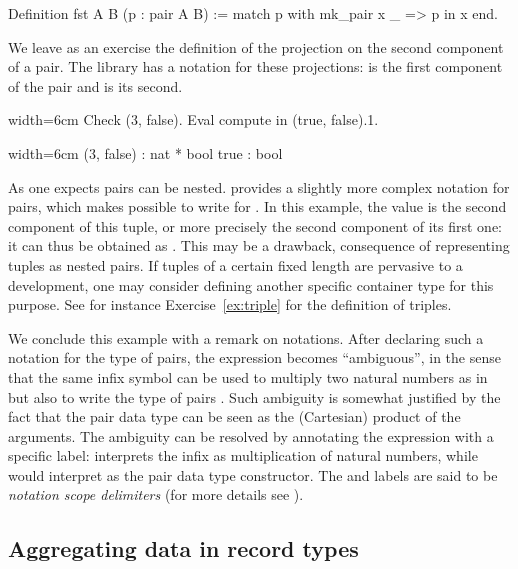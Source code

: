 \begin{coq}{}{}
Definition fst A B (p : pair A B) :=
  match p with mk_pair x _ => p in x end.
\end{coq}

We leave as an exercise the definition of the projection on the second
component of a pair. The \mcbMC{} library has a notation for these
projections:  is the first component of the pair 
and  is its second.

\begin{coq}{}{width=6cm}
Check (3, false).
Eval compute in (true, false).1.
\end{coq}
\begin{coqout}{}{width=6cm}
(3, false) : nat * bool
true : bool
\end{coqout}
As one expects pairs can be nested. \Coq{} provides a slightly more complex
notation for pairs, which makes possible to write  for
. In this example, the value  is the second
component of this tuple, or more precisely the second component of its
first one: it can thus be obtained as . This may be
a drawback, consequence of representing tuples as nested pairs. If
tuples of a certain fixed length are pervasive to a development, one
may consider defining another specific container type for this
purpose. See for instance Exercise~\ref{ex:triple} for the definition
of triples.

We conclude this example with a remark on notations. After declaring
such a notation for the type of pairs, the expression 
becomes ``ambiguous'',
in the sense that the same infix \C{*} symbol can be used to multiply two
natural numbers as in  but also to write the type of pairs .  Such ambiguity is somewhat justified by the fact that the pair
data type can be seen as the (Cartesian) product of the arguments.  The
ambiguity can be resolved by annotating the expression with a specific
label:  interprets the infix \C{*} as multiplication of natural numbers,
while  would interpret \C{*} as the pair data type
constructor. The  and  labels are said to be
\emph{notation scope delimiters} (for more details see
\cite[section 12.2]{Coq:manual}).

\subsection{Aggregating data in record types}
\label{sec:records}

